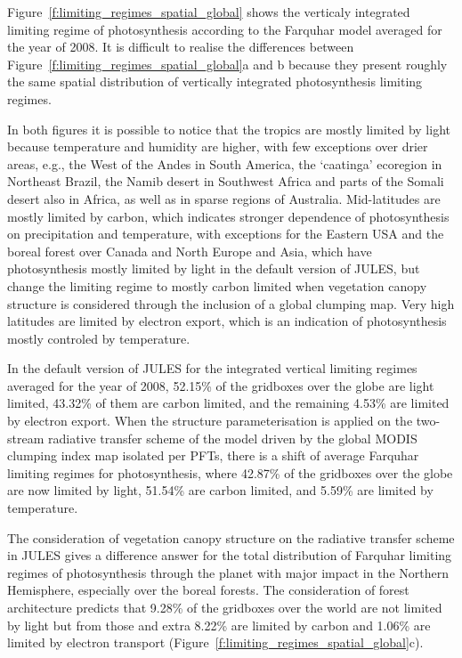 \documentclass[a4paper,11pt]{report}
\begin{document}
Figure~\ref{f:limiting_regimes_spatial_global} shows the verticaly integrated limiting regime of photosynthesis according to the Farquhar model averaged for the year of 2008. It is difficult to realise the differences between Figure~\ref{f:limiting_regimes_spatial_global}a and b because they present roughly the same spatial distribution of vertically integrated photosynthesis limiting regimes. 

In both figures it is possible to notice that the tropics are mostly limited by light because temperature and humidity are higher, with few exceptions over drier areas, e.g., the West of the Andes in South America, the `caatinga' ecoregion in Northeast Brazil, the Namib desert in Southwest Africa and parts of the Somali desert also in Africa, as well as in sparse regions of Australia. Mid-latitudes are mostly limited by carbon, which indicates stronger dependence of photosynthesis on precipitation and temperature, with exceptions for the Eastern USA and the boreal forest over Canada and North Europe and Asia, which have photosynthesis mostly limited by light in the default version of JULES, but change the limiting regime to mostly carbon limited when vegetation canopy structure is considered through the inclusion of a global clumping map. Very high latitudes are limited by electron export, which is an indication of photosynthesis mostly controled by temperature.

In the default version of JULES for the integrated vertical limiting regimes averaged for the year of 2008, 52.15\% of the gridboxes over the globe are light limited, 43.32\% of them are carbon limited, and the remaining 4.53\% are limited by electron export. When the structure parameterisation is applied on the two-stream radiative transfer scheme of the model driven by the global MODIS clumping index map \citep{He2012} isolated per PFTs, there is a shift of average Farquhar limiting regimes for photosynthesis, where 42.87\% of the gridboxes over the globe are now limited by light, 51.54\% are carbon limited, and 5.59\% are limited by temperature.

The consideration of vegetation canopy structure on the radiative transfer scheme in JULES gives a difference answer for the total distribution of Farquhar limiting regimes of photosynthesis through the planet with major impact in the Northern Hemisphere, especially over the boreal forests. The consideration of forest architecture predicts that 9.28\% of the gridboxes over the world are not limited by light but from those and extra 8.22\% are limited by carbon and 1.06\% are limited by electron transport (Figure~\ref{f:limiting_regimes_spatial_global}c).
\end{document}
